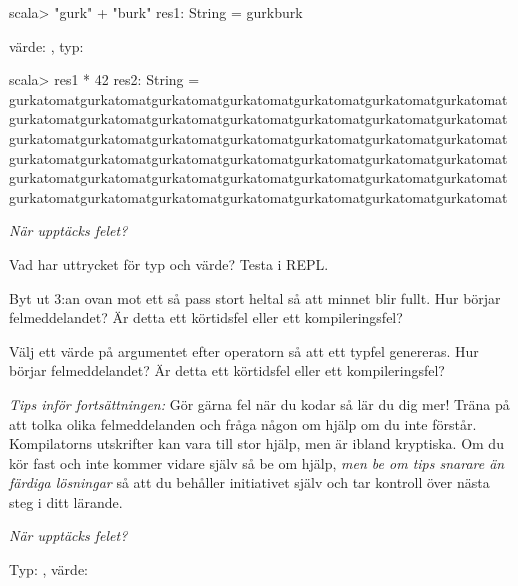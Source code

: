 \SOLUTION

\TaskSolved \what

\SubtaskSolved 
\begin{REPLnonum}
scala> "gurk" + "burk"
res1: String = gurkburk
\end{REPLnonum}
värde: , typ:  

\SubtaskSolved
\begin{REPLnonum}
scala> res1 * 42
res2: String = gurkatomatgurkatomatgurkatomatgurkatomatgurkatomatgurkatomatgurkatomatgurkatomatgurkatomatgurkatomatgurkatomatgurkatomatgurkatomatgurkatomatgurkatomatgurkatomatgurkatomatgurkatomatgurkatomatgurkatomatgurkatomatgurkatomatgurkatomatgurkatomatgurkatomatgurkatomatgurkatomatgurkatomatgurkatomatgurkatomatgurkatomatgurkatomatgurkatomatgurkatomatgurkatomatgurkatomatgurkatomatgurkatomatgurkatomatgurkatomatgurkatomatgurkatomat
\end{REPLnonum}

\QUESTEND




\def\what{\emph{När upptäcks felet?}}

\QUESTBEGIN

\Task \what 

\Subtask Vad har uttrycket  för typ och värde? Testa i REPL.

\Subtask Byt ut 3:an ovan mot ett så pass stort heltal så att minnet blir fullt. Hur börjar felmeddelandet? Är detta ett körtidsfel eller ett kompileringsfel?

\Subtask Välj ett värde på argumentet efter operatorn \code{*} så att ett typfel genereras. Hur börjar felmeddelandet? Är detta ett körtidsfel eller ett kompileringsfel?

\begin{framed}
\noindent\emph{Tips inför fortsättningen:} Gör gärna fel när du kodar så lär du dig mer! Träna på att tolka olika felmeddelanden och fråga någon om hjälp om du inte förstår. Kompilatorns utskrifter kan vara till stor hjälp, men är ibland kryptiska. Om du kör fast och inte kommer vidare själv så be om hjälp, \emph{men be om tips snarare än färdiga lösningar} så att du behåller initiativet själv och tar kontroll över nästa steg i ditt lärande.
\end{framed}


\SOLUTION

\TaskSolved \what

\SubtaskSolved Typ: , värde: 

